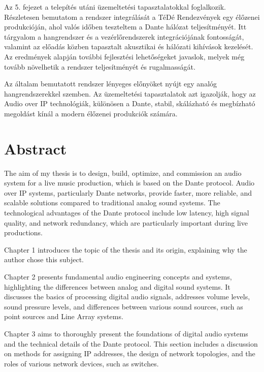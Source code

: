 Az 5. fejezet a telepítés utáni üzemeltetési tapasztalatokkal 
foglalkozik. Részletesen bemutatom a rendszer integrálását a 
TéDé Rendezvények egy élőzenei produkcióján, ahol 
valós időben teszteltem a Dante hálózat teljesítményét. 
Itt tárgyalom a hangrendszer és a vezérlőrendszerek 
integrációjának fontosságát, valamint az előadás közben 
tapasztalt akusztikai és hálózati kihívások kezelését. 
Az eredmények alapján további fejlesztési lehetőségeket 
javaslok, melyek még tovább növelhetik a rendszer teljesítményét és rugalmasságát.

Az általam bemutatott rendszer lényeges előnyöket nyújt egy analóg 
hangrendszerekkel szemben.
Az üzemeltetési tapasztalatok azt igazolják, hogy 
az Audio over IP technológiák, különösen a Dante, 
stabil, skálázható és megbízható megoldást 
kínál a modern élőzenei produkciók számára.


\vfill
\selectenglish


\chapter*{Abstract}

The aim of my thesis is to design, build, optimize, and 
commission an audio system for a live music production, 
which is based on the Dante protocol. Audio over IP 
systems, particularly Dante networks, provide faster, 
more reliable, and scalable solutions compared to 
traditional analog sound systems. The technological 
advantages of the Dante protocol include low latency, 
high signal quality, and network redundancy, which are 
particularly important during live productions.

Chapter 1 introduces the topic of the thesis and its 
origin, explaining why the author chose this subject.

Chapter 2 presents fundamental audio engineering 
concepts and systems, highlighting the differences 
between analog and digital sound systems. It discusses 
the basics of processing digital audio signals, 
addresses volume levels, sound pressure levels, and 
differences between various sound sources, such as 
point sources and Line Array systems.

Chapter 3 aims to thoroughly present the foundations 
of digital audio systems and the technical details of 
the Dante protocol. This section includes a discussion 
on methods for assigning IP addresses, the design of 
network topologies, and the roles of various network 
devices, such as switches.

